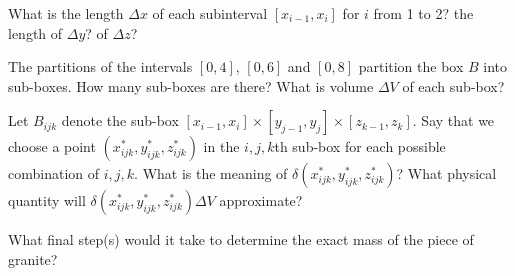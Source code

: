 \begin{pa}
    What is the length $\Delta x$ of each subinterval $[x_{i-1},x_i]$ for $i$ from 1 to 2?  the length of $\Delta y$?  of $\Delta z$?

	\item The partitions of the intervals $[0,4]$, $[0,6]$ and $[0,8]$ partition the box $B$ into sub-boxes. How many sub-boxes are there? What is volume $\Delta V$ of each sub-box?
	

	
	\item Let $B_{ijk}$ denote the sub-box $[x_{i-1},x_i] \times [y_{j-1},y_j] \times [z_{k-1}, z_k]$.
	Say that we choose a point $(x_{ijk}^*, y_{ijk}^*, z_{ijk}^*)$ in the $i,j,k$th sub-box for each possible combination of $i,j,k$.  What is the meaning of $\delta(x_{ijk}^*, y_{ijk}^*, z_{ijk}^*)$?  What physical quantity will $\delta(x_{ijk}^*, y_{ijk}^*, z_{ijk}^*) \Delta V$ approximate?
	

    \item What final step(s) would it take to determine the exact mass of the piece of granite?


\ea
\end{pa} 

